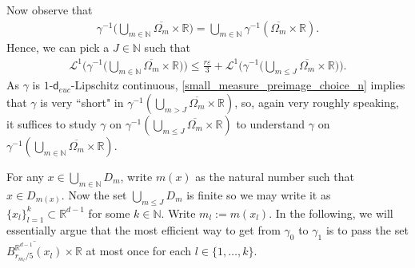\documentclass[a4paper,10pt]{article}
\numberwithin{equation}{section}
\newcommand{\R}{\mathbb{R}}
\newcommand{\N}{\mathbb{N}}
\newcommand{\e}{\varepsilon}
\newcommand{\sfd}{\mathsf d}
\begin{document}
Now observe that 
\begin{align*}
    \gamma^{-1}\Big(\bigcup_{m \in \N}\overline{\Omega_m}\times \R\Big) = \bigcup_{m \in \N} \gamma^{-1}(\overline{\Omega_m}\times \R). 
\end{align*}
Hence, we can pick a $J \in \N$ such that 
\begin{align}\label{small_measure_preimage_choice_n}
    \mathcal{L}^1\Big(\gamma^{-1}\Big(\bigcup_{m \in \N}\overline{\Omega_m}\times \R\Big)\Big) \leq \frac{r\e}{3} + \mathcal{L}^1\Big(\gamma^{-1}\Big(\bigcup_{m \leq J}\overline{\Omega_m}\times \R\Big)\Big). 
\end{align}
As $\gamma$ is $1$-$\sfd_{euc}$-Lipschitz continuous, \eqref{small_measure_preimage_choice_n} implies that $\gamma$ is very ``short" in $\gamma^{-1}(\bigcup_{m > J}\overline{\Omega_m}\times \R)$, so, again very roughly speaking, it suffices to study $\gamma$ on $\gamma^{-1}(\bigcup_{m \leq J}\overline{\Omega_m}\times \R)$ to understand $\gamma$ on $\gamma^{-1}(\bigcup_{m \in \N}\overline{\Omega_m}\times \R)$. 

For any $x \in \bigcup_{m \in \N} D_m$, write $m(x)$ as the natural number such that $x \in D_{m(x)}$. Now the set  $\bigcup_{m \leq J} D_m$ is finite so we may write it as $\{x_l\}_{l=1}^k \subset \R^{d-1}$ for some $k \in \N$. Write $m_l:= m(x_l)$. In the following, we will essentially argue that the most efficient way to get from $\gamma_0$ to $\gamma_1$ is to pass the set $\overline{B^{\R^{d-1}}_{r_{m_l}/5}(x_l)} \times \R$ at most once for each $l \in \{1, \ldots, k\}$.
\end{document}
